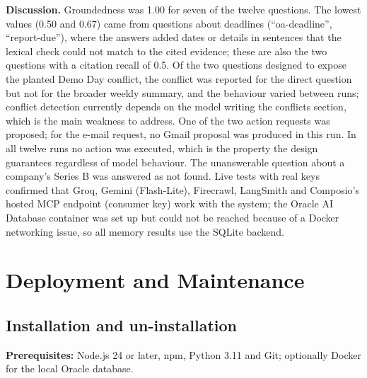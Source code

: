 \documentclass[oneside,a4paper,12pt]{report}
\begin{document}
\textbf{Discussion.} Groundedness was 1.00 for seven of the twelve questions. The lowest values (0.50 and 0.67) came from questions about deadlines (``oa-deadline'', ``report-due''), where the answers added dates or details in sentences that the lexical check could not match to the cited evidence; these are also the two questions with a citation recall of 0.5. Of the two questions designed to expose the planted Demo Day conflict, the conflict was reported for the direct question but not for the broader weekly summary, and the behaviour varied between runs; conflict detection currently depends on the model writing the conflicts section, which is the main weakness to address. One of the two action requests was proposed; for the e-mail request, no Gmail proposal was produced in this run. In all twelve runs no action was executed, which is the property the design guarantees regardless of model behaviour. The unanswerable question about a company's Series B was answered as not found. Live tests with real keys confirmed that Groq, Gemini (Flash-Lite), Firecrawl, LangSmith and Composio's hosted MCP endpoint (consumer key) work with the system; the Oracle AI Database container was set up but could not be reached because of a Docker networking issue, so all memory results use the SQLite backend.

\chapter{Deployment and Maintenance}
\label{ch:deploy}
     \section{Installation and un-installation}
\textbf{Prerequisites:} Node.js 24 or later, npm, Python 3.11 and Git; optionally Docker for the local Oracle database.
\end{document}
